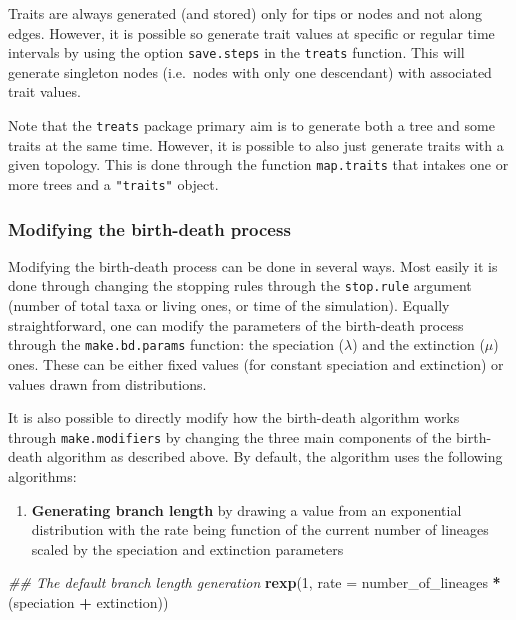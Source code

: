 \documentclass[
]{article}
\newenvironment{Shaded}{\begin{snugshade}}{\end{snugshade}}
\newcommand{\CommentTok}[1]{\textcolor[rgb]{0.56,0.35,0.01}{\textit{#1}}}
\newcommand{\DataTypeTok}[1]{\textcolor[rgb]{0.13,0.29,0.53}{#1}}
\newcommand{\DecValTok}[1]{\textcolor[rgb]{0.00,0.00,0.81}{#1}}
\newcommand{\KeywordTok}[1]{\textcolor[rgb]{0.13,0.29,0.53}{\textbf{#1}}}
\newcommand{\NormalTok}[1]{#1}
\newcommand{\OperatorTok}[1]{\textcolor[rgb]{0.81,0.36,0.00}{\textbf{#1}}}
\newcommand{\StringTok}[1]{\textcolor[rgb]{0.31,0.60,0.02}{#1}}
\providecommand{\tightlist}{%
  \setlength{\itemsep}{0pt}\setlength{\parskip}{0pt}}
\begin{document}
Traits are always generated (and stored) only for tips or nodes and not
along edges. However, it is possible so generate trait values at
specific or regular time intervals by using the option
\texttt{save.steps} in the \texttt{treats} function. This will generate
singleton nodes (i.e.~nodes with only one descendant) with associated
trait values.

Note that the \texttt{treats} package primary aim is to generate both a
tree and some traits at the same time. However, it is possible to also
just generate traits with a given topology. This is done through the
function \texttt{map.traits} that intakes one or more trees and a
\texttt{"traits"} object.

\hypertarget{modifying-the-birth-death-process}{%
\subsubsection{Modifying the birth-death
process}\label{modifying-the-birth-death-process}}

Modifying the birth-death process can be done in several ways. Most
easily it is done through changing the stopping rules through the
\texttt{stop.rule} argument (number of total taxa or living ones, or
time of the simulation). Equally straightforward, one can modify the
parameters of the birth-death process through the
\texttt{make.bd.params} function: the speciation (\(\lambda\)) and the
extinction (\(\mu\)) ones. These can be either fixed values (for
constant speciation and extinction) or values drawn from distributions.

It is also possible to directly modify how the birth-death algorithm
works through \texttt{make.modifiers} by changing the three main
components of the birth-death algorithm as described above. By default,
the algorithm uses the following algorithms:

\begin{enumerate}
\def\labelenumi{\arabic{enumi}.}
\tightlist
\item
  \textbf{Generating branch length} by drawing a value from an
  exponential distribution with the rate being function of the current
  number of lineages scaled by the speciation and extinction parameters
\end{enumerate}

\begin{Shaded}
\begin{Highlighting}[]
\CommentTok{\#\# The default branch length generation}
\KeywordTok{rexp}\NormalTok{(}\DecValTok{1}\NormalTok{, }\DataTypeTok{rate =}\NormalTok{ number\_of\_lineages }\OperatorTok{*}\StringTok{ }\NormalTok{(speciation }\OperatorTok{+}\StringTok{ }\NormalTok{extinction))}
\end{Highlighting}
\end{Shaded}
\end{document}
